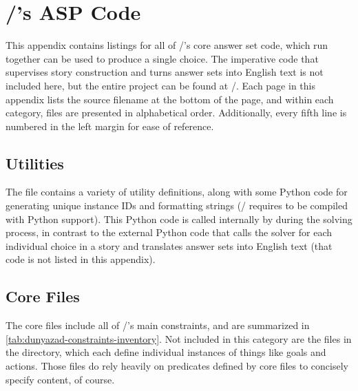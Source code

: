 \chapter{\dunyazad/'s ASP Code}
\pagestyle{listing}
\label{ap:src}%

This appendix contains listings for all of \dunyazad/'s core answer set code, which run together can be used to produce a single choice.
%
The imperative code that supervises story construction and turns answer sets into English text is not included here, but the entire project can be found at \githuburl/.
%
Each page in this appendix lists the source filename at the bottom of the page, and within each category, files are presented in alphabetical order.
%
Additionally, every fifth line is numbered in the left margin for ease of reference.

\section{Utilities}

The  file contains a variety of utility definitions, along with some Python code for generating unique instance IDs and formatting strings (\dunyazad/ requires  to be compiled with Python support).
%
This Python code is called internally by  during the solving process, in contrast to the external Python code that calls the solver for each individual choice in a story and translates answer sets into English text (that code is not listed in this appendix).


\section{Core Files}
\label{sec:src-core}

The core files include all of \dunyazad/'s main constraints, and are summarized in \cref{tab:dunyazad-constraints-inventory}.
%
Not included in this category are the files in the  directory, which each define individual instances of things like goals and actions.
%
Those files do rely heavily on predicates defined by core files to concisely specify content, of course.


